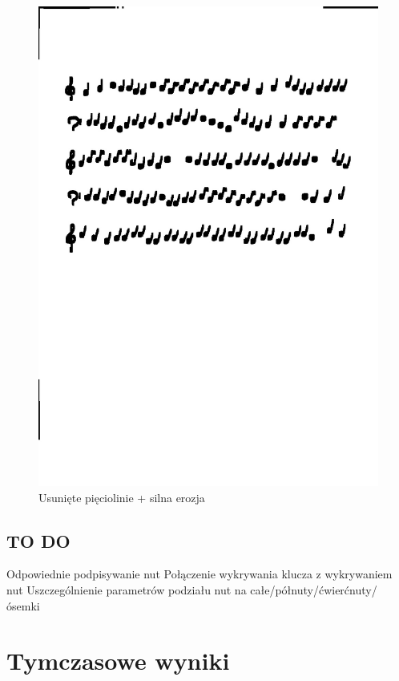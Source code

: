 \documentclass[11pt]{article}
\begin{document}
\begin{figure}[H]
    \centering
    \graphicspath{ {blobs/} }
    \includegraphics[scale=0.15]{4.jpg}
    \caption{Usunięte pięciolinie + silna erozja}
    \label{fig:universe}
    \end{figure}

\subsection{TO DO}
Odpowiednie podpisywanie nut \newline
Połączenie wykrywania klucza z wykrywaniem nut\newline
Uszczególnienie parametrów podziału nut na całe/półnuty/ćwierćnuty/ósemki\newline



\section{Tymczasowe wyniki}
\end{document}

